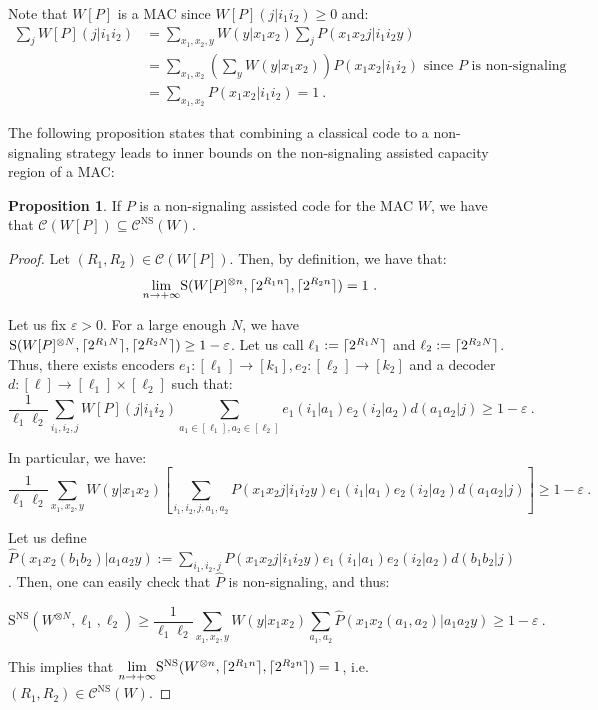 \documentclass[11pt]{article}
\theoremstyle{definition}
\newtheorem{prop}[theo]{Proposition}
\theoremstyle{remark}
\DeclarePairedDelimiter\ceil{\lceil}{\rceil}
\begin{document}
 Note that $W[P]$ is a MAC since $W[P](j|i_1i_2) \geq 0$ and:
  \begin{equation}
    \begin{aligned}
      \sum_j W[P](j|i_1i_2) &= \sum_{x_1,x_2,y}W(y|x_1x_2) \sum_j P(x_1x_2j|i_1i_2y)\\
      &= \sum_{x_1,x_2} \left(\sum_y W(y|x_1x_2)\right)P(x_1x_2|i_1i_2) \text{ since $P$ is non-signaling}\\
      &=  \sum_{x_1,x_2} P(x_1x_2|i_1i_2) = 1 \ .
    \end{aligned}
  \end{equation}
  
  The following proposition states that combining a classical code to a non-signaling strategy leads to inner bounds on the non-signaling assisted capacity region of a MAC:
  
  \begin{prop}
    \label{prop:concatCodes}
    If $P$ is a non-signaling assisted code for the MAC $W$, we have that $\mathcal{C}(W[P]) \subseteq \mathcal{C}^{\mathrm{NS}}(W)$.
  \end{prop}

  \begin{proof}
    Let $(R_1,R_2) \in \mathcal{C}(W[P])$. Then, by definition, we have that:
    \[ \underset{n \rightarrow +\infty}{\lim} \mathrm{S}(W[P]^{\otimes n},\ceil{2^{R_1n}},\ceil{2^{R_2n}}) = 1 \ . \]

    Let us fix $\varepsilon > 0$. For a large enough $N$, we have $\mathrm{S}(W[P]^{\otimes N},\ceil{2^{R_1N}},\ceil{2^{R_2N}}) \geq 1 - \varepsilon$. Let us call $\ell_1 := \ceil{2^{R_1N}}$ and $\ell_2 := \ceil{2^{R_2N}}$. Thus, there exists encoders $e_1:[\ell_1] \rightarrow [k_1],e_2:[\ell_2] \rightarrow [k_2]$ and a decoder $d:[\ell] \rightarrow [\ell_1] \times [\ell_2]$ such that:
    \[ \frac{1}{\ell_1\ell_2} \sum_{i_1,i_2,j} W[P](j|i_1i_2)\sum_{a_1 \in [\ell_1],a_2 \in [\ell_2]}e_1(i_1|a_1)e_2(i_2|a_2)d(a_1a_2|j) \geq 1 - \varepsilon \ . \]

    In particular, we have:
    \[ \frac{1}{\ell_1\ell_2} \sum_{x_1,x_2,y} W(y|x_1x_2) \left[\sum_{i_1,i_2,j,a_1,a_2}P(x_1x_2j|i_1i_2y)e_1(i_1|a_1)e_2(i_2|a_2)d(a_1a_2|j)\right] \geq 1 - \varepsilon \ . \]


    Let us define $\hat{P}(x_1x_2(b_1b_2)|a_1a_2y) := \sum_{i_1,i_2,j}P(x_1x_2j|i_1i_2y)e_1(i_1|a_1)e_2(i_2|a_2)d(b_1b_2|j)$. Then, one can easily check that $\hat{P}$ is non-signaling, and thus:

    \[ \mathrm{S}^{\mathrm{NS}}(W^{\otimes N},\ell_1,\ell_2) \geq \frac{1}{\ell_1\ell_2} \sum_{x_1,x_2,y} W(y|x_1x_2)\sum_{a_1,a_2}\hat{P}(x_1x_2(a_1,a_2)|a_1a_2y) \geq 1 - \varepsilon \ .  \]

    This implies that $\underset{n \rightarrow +\infty}{\lim} \mathrm{S}^{\mathrm{NS}}(W^{\otimes n},\ceil{2^{R_1n}},\ceil{2^{R_2n}}) = 1$, i.e. $(R_1,R_2) \in \mathcal{C}^{\mathrm{NS}}(W)$.
  \end{proof}
\end{document}
